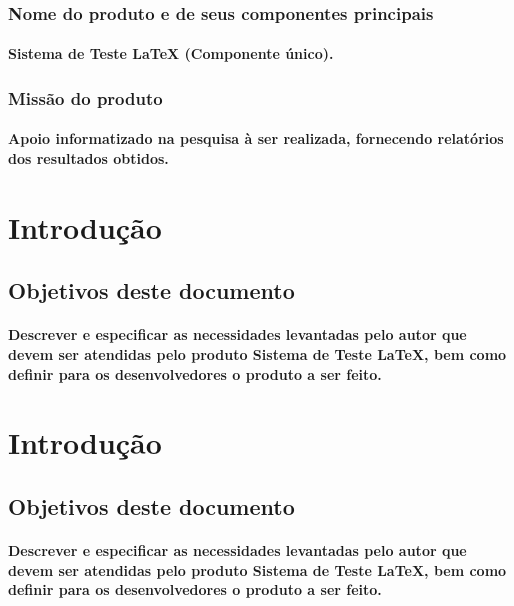 		\subsubsection{Nome do produto e de seus componentes principais}
			\paragraph{Sistema de Teste LaTeX (Componente único). }
		\subsubsection{Missão do produto}
			\paragraph{Apoio informatizado na pesquisa à ser realizada, fornecendo relatórios dos resultados obtidos.}

			
\newpage

\section{Introdução}
	\subsection{Objetivos deste documento}
		\paragraph{Descrever e especificar as necessidades levantadas pelo autor que devem ser atendidas pelo produto Sistema de Teste LaTeX, bem como definir para os desenvolvedores o produto a ser feito.}


\newpage

\section{Introdução}
	\subsection{Objetivos deste documento}
		\paragraph{Descrever e especificar as necessidades levantadas pelo autor que devem ser atendidas pelo produto Sistema de Teste LaTeX, bem como definir para os desenvolvedores o produto a ser feito.}

